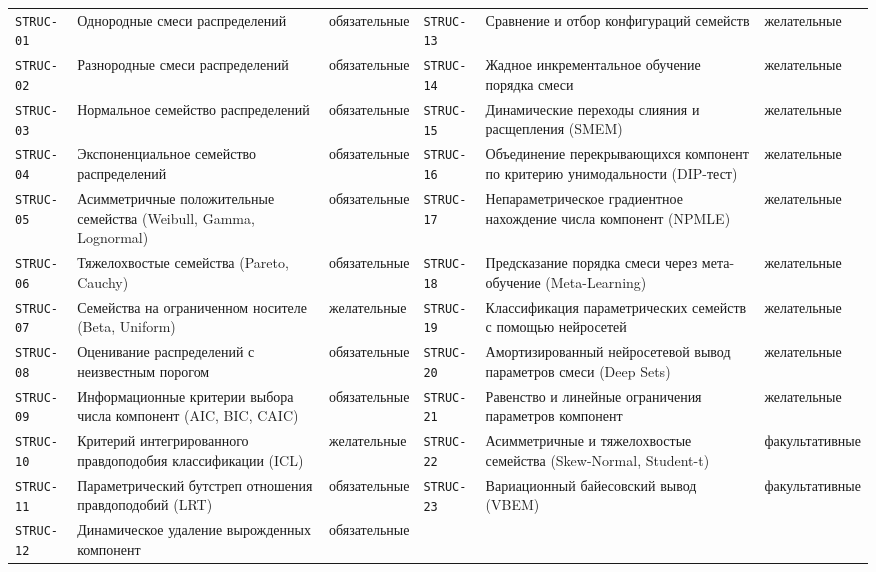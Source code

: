\documentclass[10pt,a4paper]{article}
\begin{document}
\begin{landscape}
{\begin{tabular}{@{}l >{\raggedright\arraybackslash}p{7.4cm} l l >{\raggedright\arraybackslash}p{7.4cm} l@{}}
\texttt{STRUC-01} & Однородные смеси распределений & обязательные & \texttt{STRUC-13} & Сравнение и отбор конфигураций семейств & желательные \\
\texttt{STRUC-02} & Разнородные смеси распределений & обязательные & \texttt{STRUC-14} & Жадное инкрементальное обучение порядка смеси & желательные \\
\texttt{STRUC-03} & Нормальное семейство распределений & обязательные & \texttt{STRUC-15} & Динамические переходы слияния и расщепления (SMEM) & желательные \\
\texttt{STRUC-04} & Экспоненциальное семейство распределений & обязательные & \texttt{STRUC-16} & Объединение перекрывающихся компонент по критерию унимодальности (DIP-тест) & желательные \\
\texttt{STRUC-05} & Асимметричные положительные семейства (Weibull, Gamma, Lognormal) & обязательные & \texttt{STRUC-17} & Непараметрическое градиентное нахождение числа компонент (NPMLE) & желательные \\
\texttt{STRUC-06} & Тяжелохвостые семейства (Pareto, Cauchy) & обязательные & \texttt{STRUC-18} & Предсказание порядка смеси через мета-обучение (Meta-Learning) & желательные \\
\texttt{STRUC-07} & Семейства на ограниченном носителе (Beta, Uniform) & желательные & \texttt{STRUC-19} & Классификация параметрических семейств с помощью нейросетей & желательные \\
\texttt{STRUC-08} & Оценивание распределений с неизвестным порогом & обязательные & \texttt{STRUC-20} & Амортизированный нейросетевой вывод параметров смеси (Deep Sets) & желательные \\
\texttt{STRUC-09} & Информационные критерии выбора числа компонент (AIC, BIC, CAIC) & обязательные & \texttt{STRUC-21} & Равенство и линейные ограничения параметров компонент & желательные \\
\texttt{STRUC-10} & Критерий интегрированного правдоподобия классификации (ICL) & желательные & \texttt{STRUC-22} & Асимметричные и тяжелохвостые семейства (Skew-Normal, Student-t) & факультативные \\
\texttt{STRUC-11} & Параметрический бутстреп отношения правдоподобий (LRT) & обязательные & \texttt{STRUC-23} & Вариационный байесовский вывод (VBEM) & факультативные \\
\texttt{STRUC-12} & Динамическое удаление вырожденных компонент & обязательные &  & &  \\
\end{tabular}}


\end{landscape}
\end{document}
